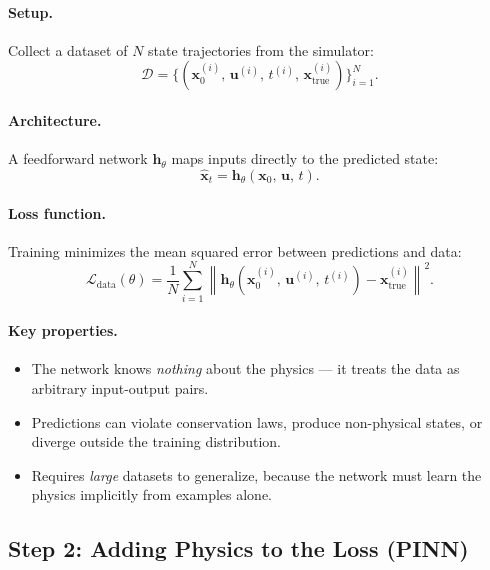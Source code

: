\documentclass[11pt]{article}
\newcommand{\xhat}{\hat{\bm{x}}}
\newcommand{\uvec}{\bm{u}}
\newcommand{\xvec}{\bm{x}}
\begin{document}
\paragraph{Setup.} Collect a dataset of $N$ state trajectories from the simulator:
\begin{equation}
    \mathcal{D} = \big\{ (\xvec_0^{(i)},\, \uvec^{(i)},\, t^{(i)},\, \xvec^{(i)}_{\mathrm{true}}) \big\}_{i=1}^{N}.
\end{equation}

\paragraph{Architecture.} A feedforward network $\bm{h}_\theta$ maps inputs directly to the predicted state:
\begin{equation}
    \xhat_t = \bm{h}_\theta(\xvec_0,\, \uvec,\, t).
\end{equation}

\paragraph{Loss function.} Training minimizes the mean squared error between predictions and data:
\begin{equation}
    \mathcal{L}_{\mathrm{data}}(\theta) = \frac{1}{N} \sum_{i=1}^{N} \left\| \bm{h}_\theta(\xvec_0^{(i)},\, \uvec^{(i)},\, t^{(i)}) - \xvec^{(i)}_{\mathrm{true}} \right\|^2.
    \label{eq:nn-loss}
\end{equation}

\paragraph{Key properties.}
\begin{itemize}
    \item The network knows \emph{nothing} about the physics --- it treats the data as arbitrary input-output pairs.
    \item Predictions can violate conservation laws, produce non-physical states, or diverge outside the training distribution.
    \item Requires \emph{large} datasets to generalize, because the network must learn the physics implicitly from examples alone.
\end{itemize}

\subsection{Step 2: Adding Physics to the Loss (PINN)}
\end{document}
